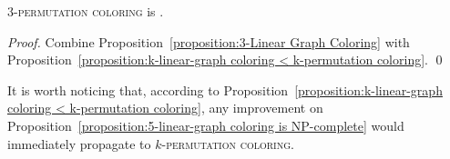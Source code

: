 \begin{corollary}
  \label{corollary:5-permutation coloring is NP-complete}
  \textsc{$3$-permutation coloring} is \NPC.
\end{corollary}

\begin{proof}
  Combine Proposition~\ref{proposition:3-Linear Graph Coloring}
  with Proposition~\ref{proposition:k-linear-graph coloring < k-permutation coloring}.
  \qed
\end{proof}

It is worth noticing that, according to
Proposition~\ref{proposition:k-linear-graph coloring < k-permutation coloring},
any improvement on Proposition~\ref{proposition:5-linear-graph coloring is NP-complete}
would immediately propagate to \textsc{$k$-permutation coloring}.
